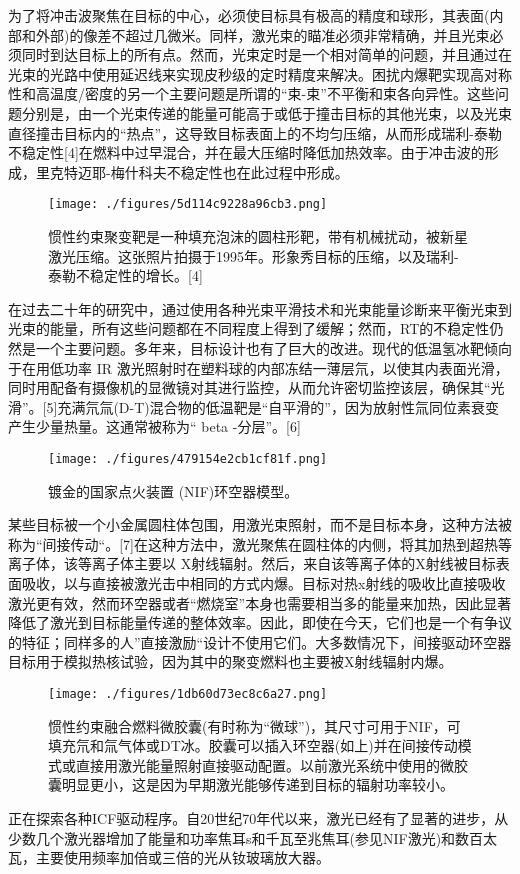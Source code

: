 为了将冲击波聚焦在目标的中心，必须使目标具有极高的精度和球形，其表面(内部和外部)的像差不超过几微米。同样，激光束的瞄准必须非常精确，并且光束必须同时到达目标上的所有点。然而，光束定时是一个相对简单的问题，并且通过在光束的光路中使用延迟线来实现皮秒级的定时精度来解决。困扰内爆靶实现高对称性和高温度/密度的另一个主要问题是所谓的“束-束”不平衡和束各向异性。这些问题分别是，由一个光束传递的能量可能高于或低于撞击目标的其他光束，以及光束直径撞击目标内的“热点”，这导致目标表面上的不均匀压缩，从而形成瑞利-泰勒不稳定性[4]在燃料中过早混合，并在最大压缩时降低加热效率。由于冲击波的形成，里克特迈耶-梅什科夫不稳定性也在此过程中形成。
\begin{figure}[ht]
\centering
\texttt{[image: ./figures/5d114c9228a96cb3.png]}
\caption{惯性约束聚变靶是一种填充泡沫的圆柱形靶，带有机械扰动，被新星激光压缩。这张照片拍摄于1995年。形象秀目标的压缩，以及瑞利-泰勒不稳定性的增长。[4]} \label{fig_GXYS_3}
\end{figure}
在过去二十年的研究中，通过使用各种光束平滑技术和光束能量诊断来平衡光束到光束的能量，所有这些问题都在不同程度上得到了缓解；然而，RT的不稳定性仍然是一个主要问题。多年来，目标设计也有了巨大的改进。现代的低温氢冰靶倾向于在用低功率 IR 激光照射时在塑料球的内部冻结一薄层氘，以使其内表面光滑，同时用配备有摄像机的显微镜对其进行监控，从而允许密切监控该层，确保其“光滑”。[5]充满氘氚(D-T)混合物的低温靶是“自平滑的”，因为放射性氚同位素衰变产生少量热量。这通常被称为“ beta -分层”。[6]
\begin{figure}[ht]
\centering
\texttt{[image: ./figures/479154e2cb1cf81f.png]}
\caption{镀金的国家点火装置 (NIF)环空器模型。} \label{fig_GXYS_4}
\end{figure}
某些目标被一个小金属圆柱体包围，用激光束照射，而不是目标本身，这种方法被称为“间接传动“。[7]在这种方法中，激光聚焦在圆柱体的内侧，将其加热到超热等离子体，该等离子体主要以 X射线辐射。然后，来自该等离子体的X射线被目标表面吸收，以与直接被激光击中相同的方式内爆。目标对热x射线的吸收比直接吸收激光更有效，然而环空器或者“燃烧室”本身也需要相当多的能量来加热，因此显著降低了激光到目标能量传递的整体效率。因此，即使在今天，它们也是一个有争议的特征；同样多的人”直接激励“设计不使用它们。大多数情况下，间接驱动环空器目标用于模拟热核试验，因为其中的聚变燃料也主要被X射线辐射内爆。
\begin{figure}[ht]
\centering
\texttt{[image: ./figures/1db60d73ec8c6a27.png]}
\caption{惯性约束融合燃料微胶囊(有时称为“微球”)，其尺寸可用于NIF，可填充氘和氚气体或DT冰。胶囊可以插入环空器(如上)并在间接传动模式或直接用激光能量照射直接驱动配置。以前激光系统中使用的微胶囊明显更小，这是因为早期激光能够传递到目标的辐射功率较小。} \label{fig_GXYS_5}
\end{figure}
正在探索各种ICF驱动程序。自20世纪70年代以来，激光已经有了显著的进步，从少数几个激光器增加了能量和功率焦耳s和千瓦至兆焦耳(参见NIF激光)和数百太瓦，主要使用频率加倍或三倍的光从钕玻璃放大器。

